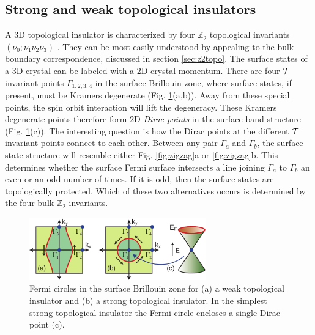 \documentclass[twocolumn,floatfix,showpacs,rmp,aps]{revtex4}
\begin{document}
\subsection{Strong and weak topological insulators}
\label{sec:strongweak}

A 3D topological insulator is characterized by four $\mathbb{Z}_2$
topological invariants $(\nu_0;\nu_1\nu_2\nu_3)$ \cite{fukanemele07,moorebalents07,roy09b}.
They can be most
easily understood by appealing to the bulk-boundary correspondence,
discussed in section \ref{sec:z2topo}.
The surface states of a 3D crystal
can be labeled with a 2D crystal
momentum.  There are four ${\cal T}$ invariant points $\Gamma_{1,2,3,4}$ in the
surface Brillouin zone, where surface states, if present, must be
Kramers degenerate (Fig. \ref{fig:surfacebz}(a,b)).  Away from these special points, the spin orbit
interaction will lift the degeneracy.  These Kramers degenerate
points therefore form 2D {\it Dirac points} in the surface band
structure (Fig. \ref{fig:surfacebz}(c)).
The interesting question is how the Dirac points at the
different ${\cal T}$ invariant points connect to each other.
Between any pair $\Gamma_a$ and $\Gamma_b$, the surface state structure will resemble
either Fig. \ref{fig:zigzag}a or \ref{fig:zigzag}b.  This determines whether the surface Fermi
surface intersects a line joining $\Gamma_a$ to $\Gamma_b$ an even
or an odd number of times.  If it is odd, then the surface states are
topologically protected.  Which of these two alternatives occurs is
determined by the four bulk $\mathbb{Z}_2$ invariants.

\begin{figure}
\includegraphics[width=3in]{Fig7}
\caption{Fermi circles in the surface Brillouin zone for (a) a weak topological insulator and
(b) a strong topological insulator.  In the simplest strong topological insulator the Fermi circle
encloses a single Dirac point (c).}
\label{fig:surfacebz}
\end{figure}
\end{document}
